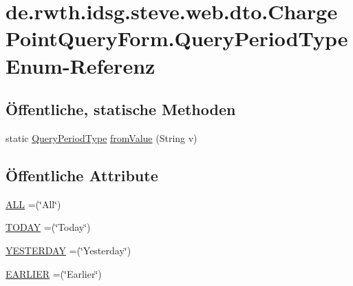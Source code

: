 \hypertarget{enumde_1_1rwth_1_1idsg_1_1steve_1_1web_1_1dto_1_1_charge_point_query_form_1_1_query_period_type}{\section{de.\+rwth.\+idsg.\+steve.\+web.\+dto.\+Charge\+Point\+Query\+Form.\+Query\+Period\+Type Enum-\/\+Referenz}
\label{enumde_1_1rwth_1_1idsg_1_1steve_1_1web_1_1dto_1_1_charge_point_query_form_1_1_query_period_type}
}
\subsection*{Öffentliche, statische Methoden}
\begin{DoxyCompactItemize}
\item 
static \hyperlink{enumde_1_1rwth_1_1idsg_1_1steve_1_1web_1_1dto_1_1_charge_point_query_form_1_1_query_period_type}{Query\+Period\+Type} \hyperlink{enumde_1_1rwth_1_1idsg_1_1steve_1_1web_1_1dto_1_1_charge_point_query_form_1_1_query_period_type_a85aadacf9fe2748ea30092d06783b445}{from\+Value} (String v)
\end{DoxyCompactItemize}
\subsection*{Öffentliche Attribute}
\begin{DoxyCompactItemize}
\item 
\hyperlink{enumde_1_1rwth_1_1idsg_1_1steve_1_1web_1_1dto_1_1_charge_point_query_form_1_1_query_period_type_ac4ce8b2768cf8d53ffcfd11afc76197f}{A\+L\+L} =(\char`\"{}All\char`\"{})
\item 
\hyperlink{enumde_1_1rwth_1_1idsg_1_1steve_1_1web_1_1dto_1_1_charge_point_query_form_1_1_query_period_type_a2760cbd2f0d43ab21fa631d97e361e02}{T\+O\+D\+A\+Y} =(\char`\"{}Today\char`\"{})
\item 
\hyperlink{enumde_1_1rwth_1_1idsg_1_1steve_1_1web_1_1dto_1_1_charge_point_query_form_1_1_query_period_type_a40d99e045a7706e89b7ccf007d45c12f}{Y\+E\+S\+T\+E\+R\+D\+A\+Y} =(\char`\"{}Yesterday\char`\"{})
\item 
\hyperlink{enumde_1_1rwth_1_1idsg_1_1steve_1_1web_1_1dto_1_1_charge_point_query_form_1_1_query_period_type_a03600283ef1d7db7a143696262f6e937}{E\+A\+R\+L\+I\+E\+R} =(\char`\"{}Earlier\char`\"{})
\end{DoxyCompactItemize}


